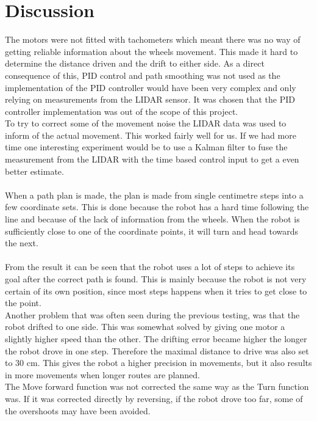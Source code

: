 \chapter{Discussion}

The motors were not fitted with tachometers which meant there was no way of getting reliable information about the wheels movement. This made it hard to determine the distance driven and the drift to either side. As a direct consequence of this, PID control and path smoothing was not used as the implementation of the PID controller would have been very complex and only relying on measurements from the LIDAR sensor. It was chosen that the PID controller implementation was out of the scope of this project. \\
To try to correct some of the movement noise the LIDAR data was used to inform of the actual movement. This worked fairly well for us. If we had more time one interesting experiment would be to use a Kalman filter to fuse the measurement from the LIDAR with the time based control input to get a even better estimate. \\\\
When a path plan is made, the plan is made from single centimetre steps into a  few coordinate sets. This is done because the robot has a hard time following the line and because of the lack of information from the wheels. When the robot is sufficiently close to one of the coordinate points, it will turn and head towards the next.\\\\
From the result it can be seen that the robot uses a lot of steps to achieve its goal after the correct path is found. This is mainly because the robot is not very certain of its own position, since most steps happens when it tries to get close to the point.\\
Another problem that was often seen during the previous testing, was that the robot drifted to one side. This was somewhat solved by giving one motor a slightly higher speed than the other. The drifting error became higher the longer the robot drove in one step. Therefore the maximal distance to drive was also set to 30 cm. This gives the robot a higher precision in movements, but it also results in more movements when longer routes are planned.\\
The Move forward function was not corrected the same way as the Turn function was. If it was corrected directly by reversing, if the robot drove too far, some of the overshoots may have been avoided.\\\\
